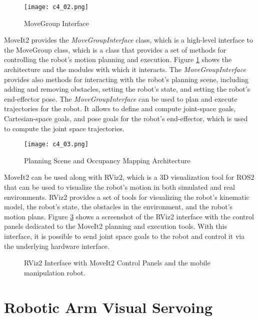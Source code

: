 \begin{figure}[t]
    \centering
    \texttt{[image: c4\_02.png]}
    \caption{MoveGroup Interface}
    \label{fig:move_group}
\end{figure}

MoveIt2 provides the \textit{MoveGroupInterface} class, which is a high-level interface to the MoveGroup class, which is a
class that provides a set of methods for controlling the robot's motion planning and execution. 
Figure \ref{fig:move_group} shows the architecture and the modules with which it interacts.
The \textit{MoveGroupInterface} provides also methods for interacting with the robot's planning scene, 
including adding and removing obstacles, setting the robot's state, and setting the robot's end-effector pose. 
The \textit{MoveGroupInterface} can be used to plan and execute trajectories for the robot. 
It allows to define and compute joint-space goals, Cartesian-space goals,
and pose goals for the robot's end-effector, which is used to compute the joint space trajectories.

\begin{figure}[t]
    \centering
    \texttt{[image: c4\_03.png]}
    \caption{Planning Scene and Occupancy Mapping Architecture}
    \label{fig:planninscence}
\end{figure}

MoveIt2 can be used along with RViz2, which is a 3D visualization tool for ROS2 that can be used to visualize the
robot's motion in both simulated and real environments. RViz2 provides a set of tools for visualizing the robot's
kinematic model, the robot's state, the obstacles in the environment, and the robot's motion plans.
Figure \ref{fig:rviz2} shows a screenshot of the RViz2 interface with the control panels dedicated to the MoveIt2
planning and execution tools. With this interface, it is possible to send joint space goals to the robot
and control it via the underlying hardware interface.

\begin{figure}[t]
    \centering
    \caption{RViz2 Interface with MoveIt2 Control Panels and the mobile manipulation robot.}
    \label{fig:rviz2}
\end{figure}

\section{Robotic Arm Visual Servoing}

